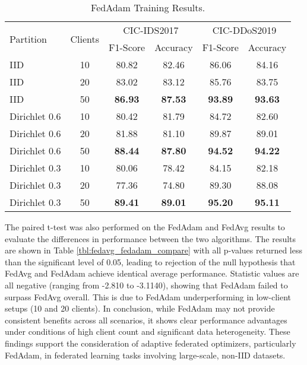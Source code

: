 \begin{table}[h]
    \caption{FedAdam Training Results.}
    \centering
    \begin{tabular}{l|c|c|c|c|c}
        \multirow{2}{*}{Partition} & \multirow{2}{*}{Clients} & \multicolumn{2}{|c|}{CIC-IDS2017} & \multicolumn{2}{|c}{CIC-DDoS2019} \\
        \cline{3-6} & & F1-Score & Accuracy & F1-Score & Accuracy \\
        \hline\hline
        IID & 10 & 80.82 & 82.46 & 86.06 & 84.16 \\
        IID & 20 & 83.02 & 83.12 & 85.76 & 83.75 \\
        IID & 50 & \textbf{86.93} & \textbf{87.53} & \textbf{93.89} & \textbf{93.63} \\
        Dirichlet 0.6 & 10 & 80.42 & 81.79 & 84.72 & 82.60 \\
        Dirichlet 0.6 & 20 & 81.88 & 81.10 & 89.87 & 89.01 \\
        Dirichlet 0.6 & 50 & \textbf{88.44} & \textbf{87.80} & \textbf{94.52} & \textbf{94.22} \\
        Dirichlet 0.3 & 10 & 80.06 & 78.42 & 84.15 & 82.18 \\
        Dirichlet 0.3 & 20 & 77.36 & 74.80 & 89.30 & 88.08 \\
        Dirichlet 0.3 & 50 & \textbf{89.41} & \textbf{89.01} & \textbf{95.20} & \textbf{95.11} \\
    \end{tabular}
    \label{tbl:fedadam_results}
\end{table}

The paired t-test was also performed on the FedAdam and FedAvg results to evaluate the differences in performance between the two algorithms. The results are shown in Table \ref{tbl:fedavg_fedadam_compare} with all p-values returned less than the significant level of 0.05, leading to rejection of the null hypothesis that FedAvg and FedAdam achieve identical average performance. Statistic values are all negative (ranging from -2.810 to -3.1140), showing that FedAdam failed to surpass FedAvg overall. This is due to FedAdam underperforming in low-client setups (10 and 20 clients). In conclusion, while FedAdam may not provide consistent benefits across all scenarios, it shows clear performance advantages under conditions of high client count and significant data heterogeneity. These findings support the consideration of adaptive federated optimizers, particularly FedAdam, in federated learning tasks involving large-scale, non-IID datasets.

